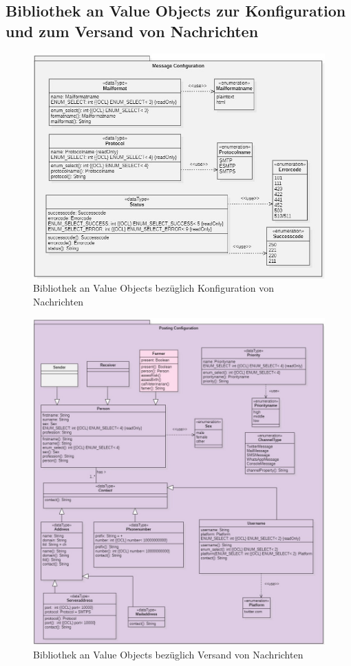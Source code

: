\begin{landscape}
\subsection{Bibliothek an Value Objects zur Konfiguration und zum Versand von Nachrichten}
\begin{figure}[H]
	\center
	\includegraphics[scale=2]{Grafiken/modelle/vo-message-configuration.jpg}
	\caption{Bibliothek an Value Objects bezüglich Konfiguration von Nachrichten} 
	\label{fig: Bibliothek an Value Objects bezüglich Konfiguration von Nachrichten} 
\end{figure}



\end{landscape}
\restoregeometry %

\begin{figure}[H]
	\center
	\includegraphics[scale=1.7]{Grafiken/modelle/vo-postConfiguration.jpg}
	\caption{Bibliothek an Value Objects bezüglich Versand von Nachrichten} 
	\label{fig: Bibliothek an Value Objects bezüglich Versand von Nachrichten} 
\end{figure}
